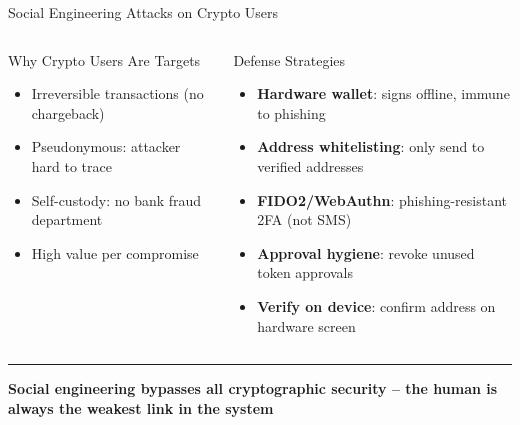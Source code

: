 \documentclass[8pt,aspectratio=169]{beamer}
\newcommand{\bottomnote}[1]{\vfill\vspace{-2mm}\textcolor{mllavender2}{\rule{\textwidth}{0.4pt}}\vspace{1mm}\footnotesize\textbf{#1}}
\begin{document}
\begin{frame}{Social Engineering Attacks on Crypto Users}
\begin{center}
\end{center}
\vspace{2mm}
\begin{columns}
\begin{block}{Why Crypto Users Are Targets}
\begin{itemize}\small
  \item Irreversible transactions (no chargeback)
  \item Pseudonymous: attacker hard to trace
  \item Self-custody: no bank fraud department
  \item High value per compromise
\end{itemize}
\end{block}
\begin{block}{Defense Strategies}
\begin{itemize}\small
  \item \textbf{Hardware wallet}: signs offline, immune to phishing
  \item \textbf{Address whitelisting}: only send to verified addresses
  \item \textbf{FIDO2/WebAuthn}: phishing-resistant 2FA (not SMS)
  \item \textbf{Approval hygiene}: revoke unused token approvals
  \item \textbf{Verify on device}: confirm address on hardware screen
\end{itemize}
\end{block}
\end{columns}
\bottomnote{Social engineering bypasses all cryptographic security -- the human is always the weakest link in the system}
\end{frame}
\end{document}
